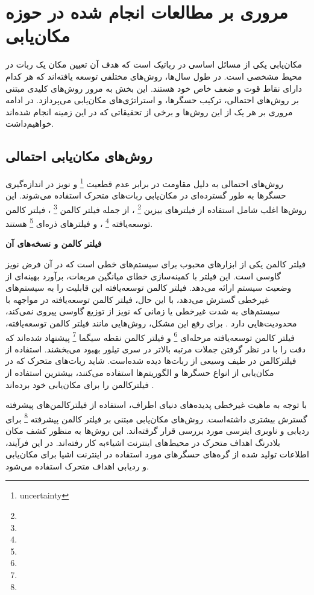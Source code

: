 \section{مروری بر مطالعات انجام شده در حوزه مکان‌یابی} 

مکان‌یابی یکی از مسائل اساسی در رباتیک است که هدف آن تعیین مکان یک ربات در محیط مشخصی است. در طول سال‌ها، روش‌های مختلفی توسعه یافته‌اند که هر کدام دارای نقاط قوت و ضعف خاص خود هستند. این بخش به مرور روش‌های کلیدی مبتنی بر روش‌های احتمالی، ترکیب حسگرها، و استراتژی‌های مکان‌یابی می‌پردازد. در ادامه مروری بر هر یک از این روش‌ها و برخی از تحقیقاتی که در این زمینه انجام شده‌اند خواهیم‌داشت.


\subsection{روش‌های مکان‌یابی احتمالی}

روش‌های احتمالی به دلیل مقاومت در برابر عدم قطعیت
\footnote{uncertainty}
 و نویز در اندازه‌گیری حسگرها به طور گسترده‌ای در مکان‌یابی ربات‌های متحرک استفاده می‌شوند. این روش‌ها اغلب شامل استفاده از فیلترهای بیزین
\footnote{}
 ، از جمله فیلتر کالمن
\footnote{}
، فیلتر کالمن توسعه‌یافته
\footnote{}
، و فیلترهای ذره‌ای
\footnote{}
 هستند.


\textbf {فیلتر کالمن و نسخه‌های آن}

فیلتر کالمن یکی از ابزارهای محبوب برای سیستم‌های خطی است که در آن فرض نویز گاوسی است. این فیلتر با کمینه‌سازی خطای میانگین مربعات، برآورد بهینه‌ای از وضعیت سیستم ارائه می‌دهد. فیلتر کالمن توسعه‌یافته این قابلیت را به سیستم‌های غیرخطی گسترش می‌دهد، با این حال،  فیلتر کالمن توسعه‌یافته در مواجهه با سیستم‌های به شدت غیرخطی یا زمانی که نویز از توزیع گاوسی پیروی نمی‌کند، محدودیت‌هایی دارد
\cite{burgard1997active}
. برای رفع این مشکل، روش‌هایی مانند فیلتر کالمن توسعه‌یافته، فیلتر کالمن توسعه‌یافته مرحله‌ای
\footnote{}
 و فیلتر کالمن نقطه سیگما
 \footnote{}
  پیشنهاد شده‌اند که دقت را با در نظر گرفتن جملات مرتبه بالاتر در سری تیلور بهبود می‌بخشند.
استفاده از فیلترکالمن در طیف وسیعی از ربات‌ها دیده‌ شده‌است. شاید ربات‌های متحرک که در مکان‌یابی از انواع حسگر‌ها و الگوریتم‌ها استفاده می‌کنند، بیشترین‌ استفاد‌ه از فیلترکالمن را برای مکان‌یابی خود برده‌اند
\cite{liu2021cost, lin2018topological, negenborn2003robot}. 

با توجه به ماهیت غیرخطی پدیده‌های دنیای اطراف، استفاده از فیلترکالمن‌های پیشرفته گسترش بیشتری داشته‌است. 
\cite{zhan2007iterated, guo2014square, xian2016square, filtermobile} 
 روش‌های مکان‌یابی مبتنی بر فیلتر کالمن پیشرفته
\footnote{}
  برای ردیابی و ناوبری اینرسی مورد بررسی قرار گرفته‌اند. این روش‌ها به منظور کشف مکان بلادرنگ اهداف متحرک در محیط‌های اینترنت اشیاءبه کار رفته‌اند. در این فرآیند، اطلاعات تولید شده از گره‌های حسگرهای مورد استفاده در اینترنت اشیا برای مکان‌یابی و ردیابی اهداف متحرک استفاده می‌شود.
  
